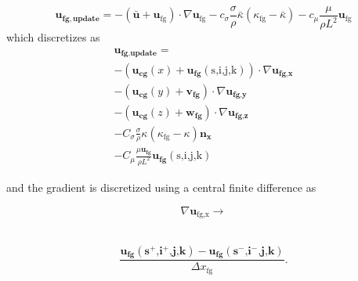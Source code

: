 \begin{equation}
 \bm{u_{fg,update}}= 
-(\bar{\bm{u}}+\bm{u}_{\text{fg}}) \cdot \nabla \bm{u}_{\text{fg}} 
-c_{\sigma}\frac{\sigma}{\rho}\bar{\kappa}(\kappa_{\text{fg}}-\bar{\kappa})- 
c_{\mu}\frac{\mu}{\rho L^2}\bm{u}_{\text{fg}}\nonumber
\label{eqn:update}
\end{equation}
which discretizes as 
\begin{multline}
 \bm{u_{\text{fg,update}}}=\\
 - ( \bm{u_{\text{cg}}}(x) + \bm{u_{\text{fg}}}(\text{s,i,j,k}) ) \cdot \nabla \bm{u_{\text{fg,x}}} \\
 - ( \bm{u_{\text{cg}}}(y) + \bm{v_{\text{fg}}}     ) \cdot \nabla \bm{u_{\text{fg,y}}} \\
 - ( \bm{u_{\text{cg}}}(z) + \bm{w_{\text{fg}}}    ) \cdot \nabla \bm{u_{\text{fg,z}}} \\
 - C_{\sigma}\frac{\sigma}{\rho}\kappa(\kappa_{\text{fg}}-\kappa)\bm{n_{\text{x}}} \\
 - C_{\mu} \frac{\mu \bm{u_{\text{fg}}}}{\rho L^2}  \bm{u_{\text{fg}}}(\text{s,i,j,k})
\end{multline}


\noindent and the gradient is discretized using a central finite difference as  

\begin{minipage}{0.25\textwidth}
	\begin{equation*}
	\nabla \bm{u}_{\text{fg,x}}  \rightarrow 
	\end{equation*}\\
\end{minipage}
\begin{minipage}{0.6\textwidth}
	\begin{equation}		
			\frac{\bm{u_{\text{fg}  }(\text{s$^+$,i$^+$,j,k}) - \bm{u_{\text{fg}  }(\text{s$^-$,i$^-$,j,k})} }}  {  \Delta x_{\text{fg}  }}.
	\end{equation}\\
\end{minipage}

